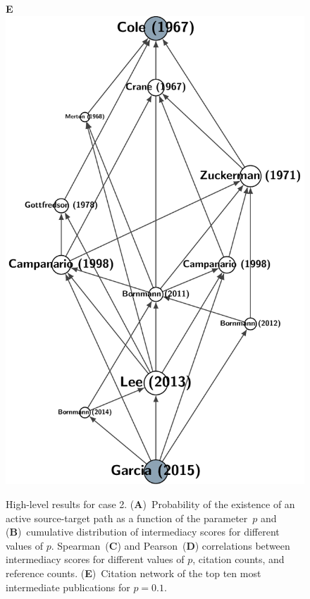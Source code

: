 \documentclass[9pt,twocolumn,twoside,lineno]{pnas-alt}
\theoremstyle{definition}
\begin{document}
\begin{figure}
\begin{minipage}{7.4cm}
  \end{minipage}\linewidth%
  \begin{minipage}{4cm}
    \vskip16pt\hskip16pt\textbf{\textsf{\footnotesize E}}\\\vskip-32pt%
    \includegraphics[width=\linewidth]{example_peerrev}
  \end{minipage}
  \caption{High-level results for case 2. (\textbf{A})~Probability of the existence of an active source-target path as a function of the parameter~$p$ and (\textbf{B})~cumulative distribution of intermediacy scores for different values of $p$. Spearman~(\textbf{C}) and Pearson~(\textbf{D}) correlations between intermediacy scores for different values of $p$, citation counts, and reference counts. (\textbf{E})~Citation network of the top ten most intermediate publications for $p = 0.1$.}
  \label{fig:pr}
\end{figure}
\end{document}
